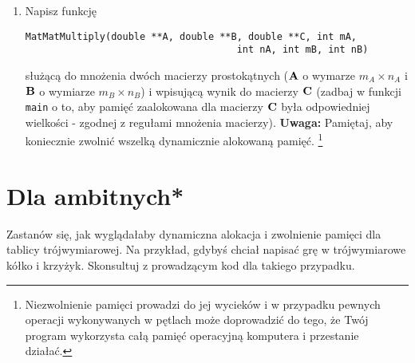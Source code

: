 \documentclass{instrukcja}
\begin{document}
\begin{enumerate}
\item Napisz funkcję \begin{verbatim}MatMatMultiply(double **A, double **B, double **C, int mA,
                                     int nA, int mB, int nB)\end{verbatim}służącą do mnożenia dwóch macierzy prostokątnych ($\bf A$ o wymarze $m_A \times n_A$ i $\bf B$ o wymiarze $m_B \times n_B$) i wpisującą wynik do macierzy $\bf C$ (zadbaj w funkcji {\tt main} o to, aby pamięć zaalokowana dla macierzy $\bf C$ była odpowiedniej wielkości - zgodnej z regułami mnożenia macierzy). {\bf Uwaga:} Pamiętaj, aby koniecznie zwolnić wszelką dynamicznie alokowaną pamięć. \footnote{Niezwolnienie pamięci prowadzi do jej wycieków i w przypadku pewnych operacji wykonywanych w pętlach może doprowadzić do tego, że Twój program wykorzysta całą pamięć operacyjną komputera i przestanie działać.}
\end{enumerate}
\section*{Dla ambitnych*}
Zastanów się, jak wyglądałaby dynamiczna alokacja i zwolnienie pamięci dla tablicy trójwymiarowej. Na przykład, gdybyś chciał napisać grę w trójwymiarowe kółko i krzyżyk. Skonsultuj z prowadzącym kod dla takiego przypadku.
\end{document}
